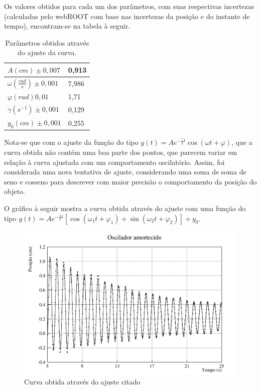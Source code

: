 \documentclass[12pt]{article}
\begin{document}
		Os valores obtidos para cada um dos parâmetros, com suas respectivas incertezas (calculadas pelo webROOT com base nas incertezas da posição e do instante de tempo), encontram-se na tabela à seguir.

		\begin{table}[H]
			\centering
			\begin{tabular}{|l|l|}
				\hline
				$A (cm) \pm 0,007$ & 0,913   \\ \hline
				$\omega (\frac{rad}{s}) \pm 0,001$ & 7,986 \\ \hline
				$\varphi (rad) 0,01$ &  1,71\\ \hline
				$\gamma (s^{-1}) \pm 0,001$ & 0,129 \\ \hline
				$y_0 (cm) \pm 0,001$ & 0,255 \\ \hline
			\end{tabular}
			\caption{Parâmetros obtidos através do ajuste da curva.}
			\label{tab:table2}
		\end{table}	

		Nota-se que com o ajuste da função do tipo $y(t)=Ae^{-\frac{\gamma}{2}t}\cos(\omega t + \varphi)$, que a curva obtida não contém uma boa parte dos pontos, que parecem variar em relação à curva ajustada com um comportamento oscilatório. Assim, foi considerada uma nova tentativa de ajuste, considerando uma soma de soma de seno e cosseno para descrever com maior precisão o comportamento da posição do objeto.
	
		O gráfico à seguir mostra a curva obtida através do ajuste com uma função do tipo $y(t)=Ae^{-\frac{\gamma}{2}t}[\cos(\omega_1 t + \varphi_1)+\sin(\omega_2 t + \varphi_2)]+y_0$.
		
		\begin{figure}[H]
			\centering
			\includegraphics[width=13cm]{grafico_6.png}
			\caption{Curva obtida através do ajuste citado}
			\label{fig:grafico_6}
		\end{figure}
	
\end{document}

